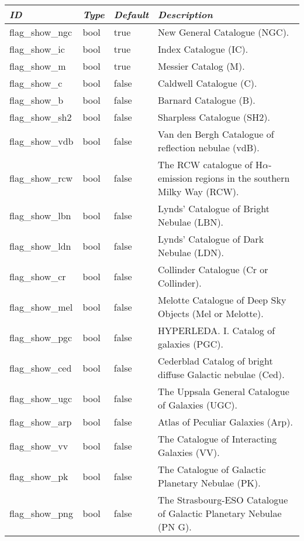 \begin{longtable}{l|l|l|p{90mm}}\toprule
\emph{ID} & \emph{Type} & \emph{Default} & \emph{Description}\\\midrule
flag\_show\_ngc   & bool & true  & New General Catalogue (NGC). \\%
flag\_show\_ic    & bool & true  & Index Catalogue (IC). \\%
flag\_show\_m     & bool & true  & Messier Catalog (M). \\%
flag\_show\_c     & bool & false & Caldwell Catalogue (C). \\%
flag\_show\_b     & bool & false & Barnard Catalogue (B). \\%
flag\_show\_sh2   & bool & false & Sharpless Catalogue (SH2). \\%
flag\_show\_vdb   & bool & false & Van den Bergh Catalogue of reflection nebulae (vdB). \\%
flag\_show\_rcw   & bool & false & The RCW catalogue of H$\alpha$-emission regions in the southern Milky Way (RCW). \\%
flag\_show\_lbn   & bool & false & Lynds' Catalogue of Bright Nebulae (LBN). \\%
flag\_show\_ldn   & bool & false & Lynds' Catalogue of Dark Nebulae (LDN). \\%
flag\_show\_cr    & bool & false & Collinder Catalogue (Cr or Collinder). \\%
flag\_show\_mel   & bool & false & Melotte Catalogue of Deep Sky Objects (Mel or Melotte).  \\%
flag\_show\_pgc   & bool & false & HYPERLEDA. I. Catalog of galaxies (PGC). \\%
flag\_show\_ced   & bool & false & Cederblad Catalog of bright diffuse Galactic nebulae (Ced). \\%
flag\_show\_ugc   & bool & false & The Uppsala General Catalogue of Galaxies (UGC). \\%
flag\_show\_arp   & bool & false & Atlas of Peculiar Galaxies (Arp). \\%
flag\_show\_vv    & bool & false & The Catalogue of Interacting Galaxies (VV). \\%
flag\_show\_pk    & bool & false & The Catalogue of Galactic Planetary Nebulae (PK). \\%
flag\_show\_png   & bool & false & The Strasbourg-ESO Catalogue of Galactic Planetary Nebulae (PN G). \\%

\end{longtable}
